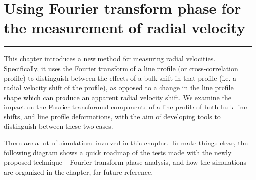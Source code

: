 \chapter{Using Fourier transform phase for the measurement of radial velocity}
\label{\thechapter}
\label{ch:Methods}


\rule{\textwidth}{1.6pt}
\minitoc
\clearpage



\label{\thesection}

This chapter introduces a new method for measuring radial velocities. Specifically, it uses the Fourier transform
of a line profile (or cross-correlation profile) to distinguish between the effects of a bulk shift in that profile (i.e. a radial velocity shift of the profile), as opposed to a change in the line profile shape which can produce an apparent radial velocity shift. We examine the impact on the Fourier transformed components of a line profile of both bulk line shifts, and line profile deformations, with the aim of developing tools to distinguish between these two cases.

There are a lot of simulations involved in this chapter. To make things clear, the following diagram shows a quick roadmap of the tests made with the newly proposed technique -- Fourier transform phase analysis, and how the simulations are organized in the chapter, for future reference.
 
